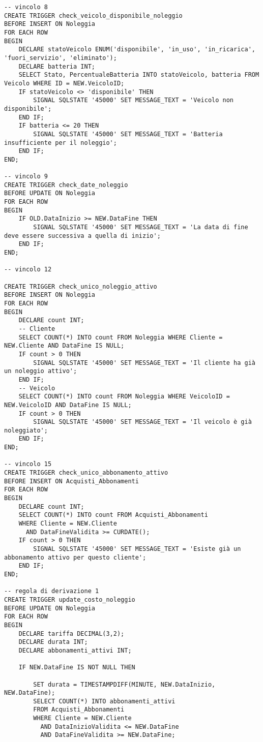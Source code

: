 \documentclass{article}
\begin{document}
\begin{lstlisting}
-- vincolo 8
CREATE TRIGGER check_veicolo_disponibile_noleggio
BEFORE INSERT ON Noleggia
FOR EACH ROW
BEGIN
    DECLARE statoVeicolo ENUM('disponibile', 'in_uso', 'in_ricarica', 'fuori_servizio', 'eliminato');
    DECLARE batteria INT;
    SELECT Stato, PercentualeBatteria INTO statoVeicolo, batteria FROM Veicolo WHERE ID = NEW.VeicoloID;
    IF statoVeicolo <> 'disponibile' THEN
        SIGNAL SQLSTATE '45000' SET MESSAGE_TEXT = 'Veicolo non disponibile';
    END IF;
    IF batteria <= 20 THEN
        SIGNAL SQLSTATE '45000' SET MESSAGE_TEXT = 'Batteria insufficiente per il noleggio';
    END IF;
END;

-- vincolo 9
CREATE TRIGGER check_date_noleggio
BEFORE UPDATE ON Noleggia
FOR EACH ROW
BEGIN
    IF OLD.DataInizio >= NEW.DataFine THEN
        SIGNAL SQLSTATE '45000' SET MESSAGE_TEXT = 'La data di fine deve essere successiva a quella di inizio';
    END IF;
END;

-- vincolo 12

CREATE TRIGGER check_unico_noleggio_attivo
BEFORE INSERT ON Noleggia
FOR EACH ROW
BEGIN
    DECLARE count INT;
    -- Cliente
    SELECT COUNT(*) INTO count FROM Noleggia WHERE Cliente = NEW.Cliente AND DataFine IS NULL;
    IF count > 0 THEN
        SIGNAL SQLSTATE '45000' SET MESSAGE_TEXT = 'Il cliente ha già un noleggio attivo';
    END IF;
    -- Veicolo
    SELECT COUNT(*) INTO count FROM Noleggia WHERE VeicoloID = NEW.VeicoloID AND DataFine IS NULL;
    IF count > 0 THEN
        SIGNAL SQLSTATE '45000' SET MESSAGE_TEXT = 'Il veicolo è già noleggiato';
    END IF;
END;

-- vincolo 15
CREATE TRIGGER check_unico_abbonamento_attivo
BEFORE INSERT ON Acquisti_Abbonamenti
FOR EACH ROW
BEGIN
    DECLARE count INT;
    SELECT COUNT(*) INTO count FROM Acquisti_Abbonamenti
    WHERE Cliente = NEW.Cliente
      AND DataFineValidita >= CURDATE();
    IF count > 0 THEN
        SIGNAL SQLSTATE '45000' SET MESSAGE_TEXT = 'Esiste già un abbonamento attivo per questo cliente';
    END IF;
END;

-- regola di derivazione 1
CREATE TRIGGER update_costo_noleggio
BEFORE UPDATE ON Noleggia
FOR EACH ROW
BEGIN
    DECLARE tariffa DECIMAL(3,2);
    DECLARE durata INT;
    DECLARE abbonamenti_attivi INT;

    IF NEW.DataFine IS NOT NULL THEN
        
        SET durata = TIMESTAMPDIFF(MINUTE, NEW.DataInizio, NEW.DataFine);
        SELECT COUNT(*) INTO abbonamenti_attivi
        FROM Acquisti_Abbonamenti
        WHERE Cliente = NEW.Cliente
          AND DataInizioValidita <= NEW.DataFine
          AND DataFineValidita >= NEW.DataFine;


\end{lstlisting}
\end{document}
